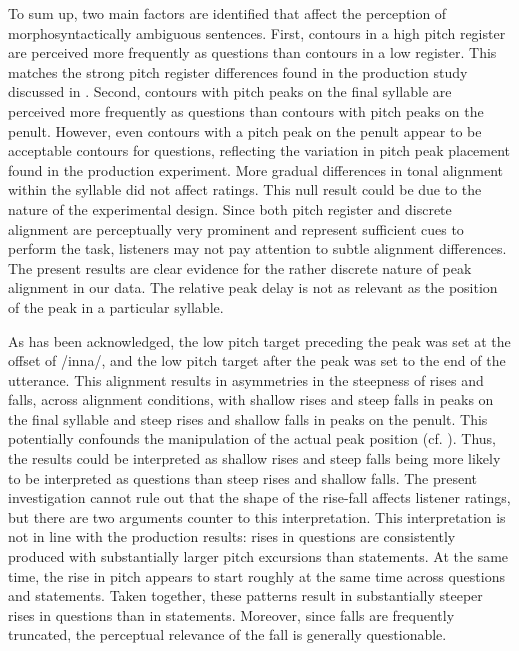 \largerpage
To sum up, two main factors are identified that affect the perception of morphosyntactically ambiguous sentences. First, contours in a high pitch register are perceived more frequently as questions than contours in a low register. This matches the strong pitch register differences found in the production study discussed in . Second, contours with pitch peaks on the final syllable are perceived more frequently as questions than contours with pitch peaks on the penult. However, even contours with a pitch peak on the penult appear to be acceptable contours for questions, reflecting the variation in pitch peak placement found in the production experiment. More gradual differences in tonal alignment within the syllable did not affect ratings. This null result could be due to the nature of the experimental design. Since both pitch register and discrete alignment are perceptually very prominent and represent sufficient cues to perform the task, listeners may not pay attention to subtle alignment differences. The present results are clear evidence for the rather discrete nature of peak alignment in our data. The relative peak delay is not as relevant as the position of the peak in a particular syllable.

As has been acknowledged, the low pitch target preceding the peak was set at the offset of /inna/, and the low pitch target after the peak was set to the end of the utterance. This alignment results in asymmetries in the steepness of rises and falls, across alignment conditions, with shallow rises and steep falls in peaks on the final syllable and steep rises and shallow falls in peaks on the penult. This potentially confounds the manipulation of the actual peak position (cf. ). Thus, the results could be interpreted as shallow rises and steep falls being more likely to be interpreted as questions than steep rises and shallow falls. The present investigation cannot rule out that the shape of the rise-fall affects listener ratings, but there are two arguments counter to this interpretation. This interpretation is not in line with the production results: rises in questions are consistently produced with substantially larger pitch excursions than statements. At the same time, the rise in pitch appears to start roughly at the same time across questions and statements. Taken together, these patterns result in substantially steeper rises in questions than in statements. Moreover, since falls are frequently truncated, the perceptual relevance of the fall is generally questionable.

